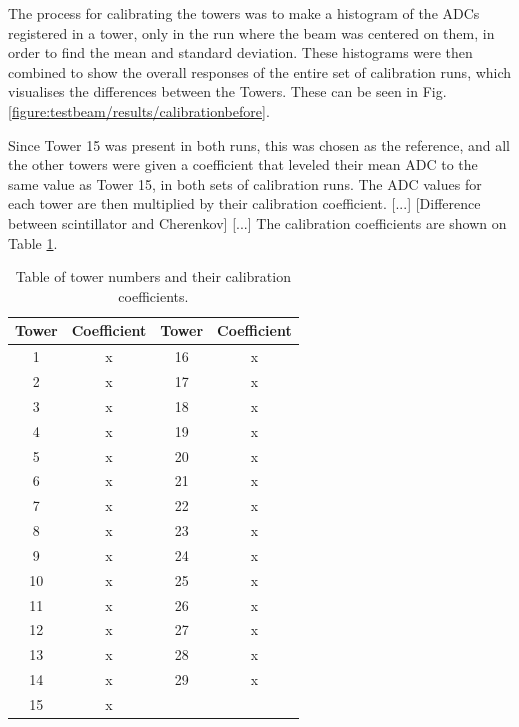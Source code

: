 
The process for calibrating the towers was to make a histogram of the \acrshort{ADC}s registered in a tower, only in the run where the beam was centered on them, in order to find the mean and standard deviation. These histograms were then combined to show the overall responses of the entire set of calibration runs, which visualises the differences between the Towers. These can be seen in Fig. \ref{figure:testbeam/results/calibrationbefore}. 

Since Tower 15 was present in both runs, this was chosen as the reference, and all the other towers were given a coefficient that leveled their mean \acrshort{ADC} to the same value as Tower 15, in both sets of calibration runs. The \acrshort{ADC} values for each tower are then multiplied by their calibration coefficient. [...] [Difference between scintillator and Cherenkov] [...] The calibration coefficients are shown on Table \ref{table:idea/calibrationcoeffs}.

\begin{table}[h]
\centering
	\begin{tabular}{ c c | c c }
	\hline \hline
	\textbf{Tower} & \textbf{Coefficient} & \textbf{Tower} & \textbf{Coefficient} \\ \hline \hline
	 1 & x & 16 & x \\
	 2 & x & 17 & x \\
	 3 & x & 18 & x \\
	 4 & x & 19 & x \\
	 5 & x & 20 & x \\
	 6 & x & 21 & x \\
	 7 & x & 22 & x \\
	 8 & x & 23 & x \\
	 9 & x & 24 & x \\
	10 & x & 25 & x \\
	11 & x & 26 & x \\
	12 & x & 27 & x \\
	13 & x & 28 & x \\
	14 & x & 29 & x \\
	15 & x &    &    \\ \hline
	\end{tabular}
	\caption{Table of tower numbers and their calibration coefficients.}
	\label{table:idea/calibrationcoeffs}
\end{table}

